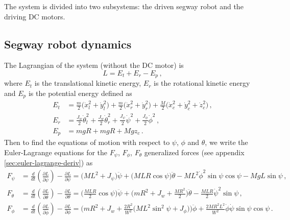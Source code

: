 \documentclass[a4paper]{article}
\newcommand{\pitch}{\psi}
\newcommand{\yaw}{\phi}
\newcommand{\roll}{\theta}
\begin{document}
The system is divided into two subsystems: the driven segway robot
and the driving DC motors.

\subsection{Segway robot dynamics}

The Lagrangian of the system (without the DC motor) is
\begin{equation}
    L = E_t + E_r - E_p \,,
\end{equation}
where $E_t$ is the translational kinetic energy, $E_r$ is the rotational 
kinetic energy and $E_p$ is the potential energy defined as
\begin{equation} \begin{split}
    E_t &= \frac{m}{2} \big( \dot{x}_l^2 + \dot{y}_l^2 \big)
         + \frac{m}{2} \big( \dot{x}_r^2 + \dot{y}_r^2 \big)
         + \frac{M}{2} \big( \dot{x}_c^2 + \dot{y}_c^2 + \dot{z}_c^2 \big)
        \,, \\
    E_r &= \frac{J_w}{2} \dot{\roll}_l^2 + \frac{J_w}{2} \dot{\roll}_r^2
         + \frac{J_\pitch}{2} \dot{\pitch}^2 + \frac{J_\yaw}{2} \dot{\yaw}^2
        \,, \\
    E_p &= m g R + m g R + M g z_c
        \,.
\end{split} \end{equation}
Then to find the equations of motion with respect to $\pitch$, $\yaw$ and
$\roll$, we write the Euler-Lagrange equations for the $F_\pitch$, $F_\yaw$,
$F_\roll$ generalized forces (see appendix \ref{sec:euler-lagrange-deriv}) as
\begin{equation} \begin{split}
    F_\pitch &= \frac{d}{dt}\left(\frac{\partial L}{\partial\dot\pitch}\right)
              - \frac{\partial L}{\partial\pitch}
              = \big( M L^2 + J_\pitch \big) \ddot\pitch
              + \big( M L R \cos\pitch \big) \ddot\roll
              - M L^2 \dot\yaw^2 \sin\pitch \cos\pitch
              - M g L \sin\pitch
    \,, \\
    F_\roll &= \frac{d}{dt}\left(\frac{\partial L}{\partial\dot\roll}\right)
             - \frac{\partial L}{\partial\roll}
             = \bigg( \frac{M L R}{2} \cos\pitch \bigg) \ddot\pitch
             + \bigg( m R^2 + J_w + \frac{M R^2}{2} \bigg) \ddot\roll
             - \frac{M L R}{2} \dot\pitch^2 \sin\pitch
    \,, \\
    F_\yaw &= \frac{d}{dt}\left(\frac{\partial L}{\partial\dot\yaw}\right)
            - \frac{\partial L}{\partial\yaw}
            = \bigg( m R^2 + J_w
                   + \frac{2 R^2}{W^2}
                     \big( M L^2 \sin^2\pitch + J_\yaw \big)
              \bigg) \ddot\yaw
            + \frac{2 M R^2 L^2}{W^2}
              \dot\yaw \dot\pitch \sin\pitch \cos\pitch
    \,.
\end{split} \end{equation}
\end{document}

